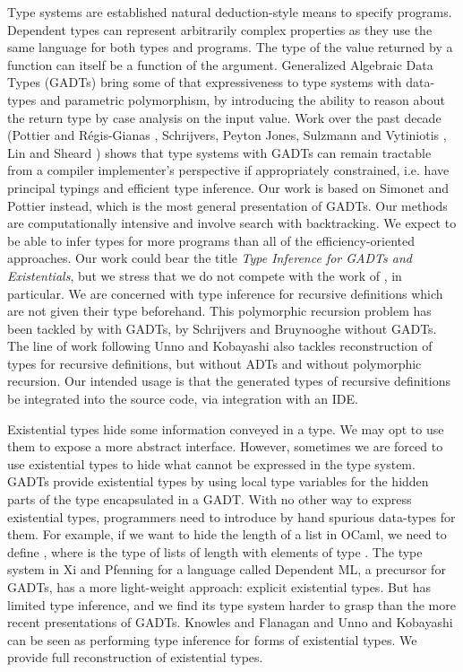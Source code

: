 \documentclass{article}
\newcommand{\tmem}[1]{{\em #1\/}}
\newcommand{\tmverbatim}[1]{{\ttfamily{#1}}}
\begin{document}
Type systems are established natural deduction-style means to specify
programs. Dependent types can represent arbitrarily complex properties as they
use the same language for both types and programs. The type of the value
returned by a function can itself be a function of the argument. Generalized
Algebraic Data Types (GADTs) bring some of that expressiveness to type systems
with data-types and parametric polymorphism, by introducing the ability to
reason about the return type by case analysis on the input value. Work over
the past decade (Pottier and R{\'e}gis-Gianas {\cite{StratifiedGADTs}},
Schrijvers, Peyton Jones, Sulzmann  and  Vytiniotis
{\cite{ComplDecidableGADTs}}, Lin  and  Sheard {\cite{PointwiseGADTs}}) shows
that type systems with GADTs can remain tractable from a compiler
implementer's perspective if appropriately constrained, i.e. have principal
typings and efficient type inference. Our work is based on Simonet and Pottier
{\cite{simonet-pottier-hmg-toplas}} instead, which is the most general
presentation of GADTs. Our methods are computationally intensive and involve
search with backtracking. We expect to be able to infer types for more
programs than all of the efficiency-oriented approaches. Our work could bear
the title {\tmem{Type Inference for GADTs and Existentials}}, but we stress
that we do not compete with the work of {\cite{StratifiedGADTs}},
{\cite{ComplDecidableGADTs}} in particular. We are concerned with type
inference for recursive definitions which are not given their type beforehand.
This polymorphic recursion problem has been tackled by {\cite{PointwiseGADTs}}
with GADTs, by Schrijvers and Bruynooghe {\cite{ADTReconstruct}} without
GADTs. The line of work following Unno and Kobayashi
{\cite{InterpolationInfer}} also tackles reconstruction of types for recursive
definitions, but without ADTs and without polymorphic recursion. Our intended
usage is that the generated types of recursive definitions be integrated into
the source code, via integration with an IDE.

Existential types hide some information conveyed in a type. We may opt to use
them to expose a more abstract interface. However, sometimes we are forced to
use existential types to hide what cannot be expressed in the type system.
GADTs provide existential types by using local type variables for the hidden
parts of the type encapsulated in a GADT. With no other way to express
existential types, programmers need to introduce by hand spurious data-types
for them. For example, if we want to hide the length of a list in OCaml, we
need to define \tmverbatim{type \_ elist = List : ('a, 'b) llist -> 'a elist},
where \tmverbatim{('a, 'b) llist} is the type of lists of length
\tmverbatim{'b} with elements of type \tmverbatim{'a}. The type system in Xi 
and  Pfenning {\cite{DML99}} for a language called Dependent ML, a precursor
for GADTs, has a more light-weight approach: explicit existential types. But
{\cite{DML99}} has limited type inference, and we find its type system harder
to grasp than the more recent presentations of GADTs. Knowles  and  Flanagan
{\cite{KnowlesF07}} and Unno  and  Kobayashi {\cite{InterpolationInfer}} can
be seen as performing type inference for forms of existential types. We
provide full reconstruction of existential types.
\end{document}
